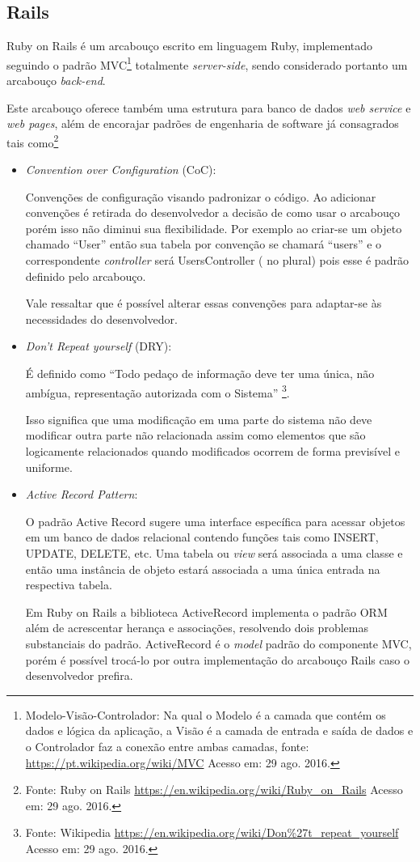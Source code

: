 \subsection{Rails}

\par Ruby on Rails é um arcabouço escrito em linguagem Ruby, implementado seguindo o padrão MVC\footnote{Modelo-Visão-Controlador: Na qual o Modelo é a camada que contém os dados e lógica da aplicação, a Visão é a camada de entrada e saída de dados e o Controlador faz a conexão entre ambas camadas, fonte: \url{https://pt.wikipedia.org/wiki/MVC} Acesso em: 29 ago. 2016.} totalmente \emph{server-side}, sendo considerado portanto um arcabouço \emph{back-end}.
\par Este arcabouço oferece também uma estrutura para banco de dados \emph{web service} e \emph{web pages}, além de encorajar padrões de engenharia de software já consagrados tais como\footnote{Fonte: Ruby on Rails \url{https://en.wikipedia.org/wiki/Ruby_on_Rails} Acesso em: 29 ago. 2016.}
\begin{itemize}
\item {\emph{Convention over Configuration} (CoC):}
    \par Convenções de configuração visando padronizar o código. Ao adicionar convenções é retirada do desenvolvedor a decisão de como usar o arcabouço porém isso não diminui sua flexibilidade. Por exemplo ao criar-se um objeto chamado ``User'' então sua tabela por convenção se chamará ``users'' e o correspondente \emph{controller} será UsersController ( no plural) pois esse é padrão definido pelo arcabouço.
    \par Vale ressaltar que é possível alterar essas convenções para adaptar-se às necessidades do desenvolvedor.

\item {\emph{Don't Repeat yourself} (DRY):}
    \par É definido como ``Todo pedaço de informação deve ter uma única, não ambígua, representação autorizada com o Sistema'' \footnote{Fonte: Wikipedia \url{https://en.wikipedia.org/wiki/Don\%27t_repeat_yourself} Acesso em: 29 ago. 2016.}.
    \par Isso significa que uma modificação em uma parte do sistema não deve modificar outra parte não relacionada assim como elementos que são logicamente relacionados quando modificados ocorrem de forma previsível e uniforme.

\item { \emph{Active Record Pattern}:}
    \par O padrão Active Record sugere uma interface específica para acessar objetos em um banco de dados relacional contendo funções tais como INSERT, UPDATE, DELETE, etc. Uma tabela ou \emph{view} será associada a uma classe e então uma instância de objeto estará associada a uma única entrada na respectiva tabela.
    \par Em Ruby on Rails a biblioteca ActiveRecord implementa o padrão ORM além de acrescentar herança e associações, resolvendo dois problemas substanciais do padrão. ActiveRecord é o \emph{model} padrão do componente MVC, porém é possível trocá-lo por outra implementação do arcabouço Rails caso o desenvolvedor prefira.
\end{itemize}
